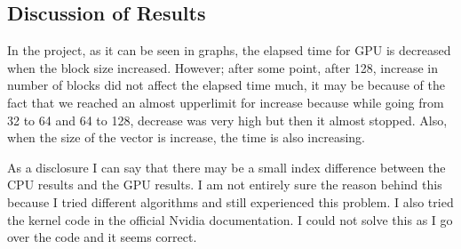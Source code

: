 \documentclass[a4paper,11pt]{article}
\theoremstyle{mytheor}
\begin{document}
\FloatBarrier
\subsection{Discussion of Results}

In the project, as it can be seen in graphs, the elapsed time for GPU is decreased when the block size increased. However; after some point, after 128, increase in number of blocks did not affect the elapsed time much, it may be because of the fact that we reached an almost upperlimit for increase because while going from 32 to 64 and 64 to 128, decrease was very high but then it almost stopped. Also, when the size of the vector is increase, the time is also increasing. 

As a disclosure I can say that there may be a small index difference between the CPU results and the GPU results. I am not entirely sure the reason behind this because I tried different algorithms and still experienced this problem. I also tried the kernel code in the official Nvidia documentation. I could not solve this as I go over the code and it seems correct.
\end{document}
